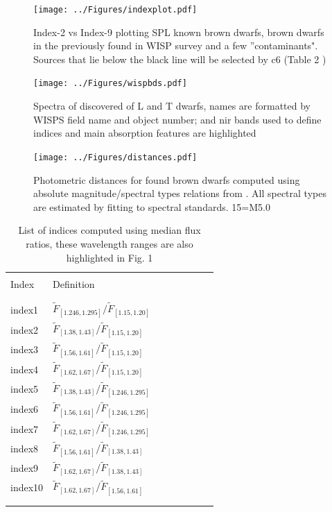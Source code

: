 \documentclass[preprint]{aastex}
\begin{document}
\clearpage
\begin{figure}[!htb]
\center
{}
\texttt{[image: ../Figures/indexplot.pdf]}
\caption{Index-2 vs Index-9 plotting SPL known brown dwarfs, brown dwarfs in the previously found in WISP survey and a few ''contaminants". Sources that lie below the black line will be selected by c6 (Table 2 )
 }
 \end{figure}
\clearpage
\begin{figure}[!htb]
\center
{}
\texttt{[image: ../Figures/wispbds.pdf]}
\caption{ Spectra of discovered of L and T dwarfs, names are formatted by WISPS field name and object number; and nir bands used to define indices and main absorption features are highlighted}
\end{figure}

\clearpage
\begin{figure}[!htb]
\center
{}
\texttt{[image: ../Figures/distances.pdf]}
\caption{ Photometric distances for found brown dwarfs computed using absolute magnitude/spectral types relations from \citet{2012ApJS..201...19D}. All spectral types are estimated by fitting to spectral standards. 15=M5.0}
\end{figure}

\clearpage
\begin{table}
\center
\begin{tabular}{llrrrrrr}
\\ \hline \hline \\
    Index & Definition \\
\\ \hline \hline \\
    index1 & $ \widetilde{F}_{[1.246, 1.295]}/ \widetilde{F}_{[1.15, 1.20]}$ \\
    index2 & $ \widetilde{F}_{[1.38, 1.43]}/ \widetilde{F}_{[1.15, 1.20] }$\\
    index3 & $ \widetilde{F}_{[1.56, 1.61]}/ \widetilde{F}_{[1.15, 1.20]}$ \\
    index4 & $ \widetilde{F}_{[1.62,1.67]}/ \widetilde{F}_{[1.15, 1.20]}$ \\
    index5 & $ \widetilde{F}_{[1.38, 1.43] }/ \widetilde{F}_{ [1.246, 1.295]}$ \\
    index6 & $ \widetilde{F}_{[1.56, 1.61] }/ \widetilde{F}_{[1.246, 1.295]}$\\
    index7&  $ \widetilde{F}_{[1.62,1.67]}/ \widetilde{F}_{[1.246, 1.295]}$\\
    index8 & $ \widetilde{F}_{[1.56, 1.61]}/ \widetilde{F}_{[1.38, 1.43]}$\\
    index9 & $ \widetilde{F}_{[1.62,1.67]}/ \widetilde{F}_{[1.38, 1.43]}$ \\
    index10 & $ \widetilde{F}_{ [1.62,1.67]}/ \widetilde{F}_{[1.56, 1.61]}$\\
    
\\ \hline \hline \\
\end{tabular}
\caption{List of indices computed using median flux ratios, these wavelength ranges are also highlighted in Fig. 1}
\end{table}
\end{document}
